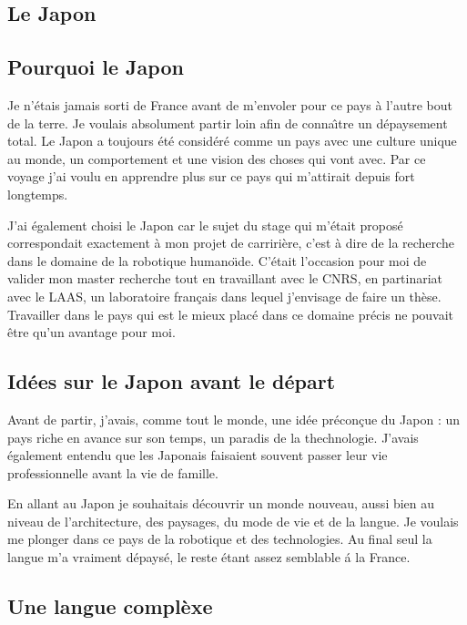 \documentclass[journal]{RapportFR}
\begin{document}
\begin{CJK*}{UTF8}{min}
\section{Le Japon}

\subsection{Pourquoi le Japon}

Je n'\'etais jamais sorti de France avant de m'envoler pour ce pays \`a l'autre bout de la terre. Je voulais absolument partir loin afin de conna\^\i tre un d\'epaysement total.
Le Japon a toujours \'et\'e consid\'er\'e comme un pays avec une culture unique au monde, un comportement et une vision des choses qui vont avec. Par ce voyage j'ai voulu en apprendre plus sur ce pays qui m'attirait depuis fort longtemps. 

J'ai \'egalement choisi le Japon car le sujet du stage qui m'\'etait propos\'e correspondait exactement \`a mon projet de carriri\`ere, c'est \`a dire de la recherche dans le domaine de la robotique humano\"\i de. C'\'etait l'occasion pour moi de valider mon master recherche tout en travaillant avec le CNRS, en partinariat avec le LAAS, un laboratoire français dans lequel j'envisage de faire un th\`ese. Travailler dans le pays qui est le mieux plac\'e dans ce domaine pr\'ecis ne pouvait \^etre qu'un avantage pour moi.

\subsection{Id\'ees sur le Japon avant le d\'epart}

Avant de partir, j'avais, comme tout le monde, une id\'ee pr\'econ\c cue du Japon : un pays riche en avance sur son temps, un paradis de la thechnologie. J'avais \'egalement entendu que les Japonais faisaient souvent passer leur vie professionnelle avant la vie de famille. 

En allant au Japon je souhaitais d\'ecouvrir un monde nouveau, aussi bien au niveau de l'architecture, des paysages, du mode de vie et de la langue. Je voulais me plonger dans ce pays de la robotique et des technologies. Au final seul la langue m'a vraiment d\'epays\'e, le reste \'etant assez semblable \'a la France.

\subsection{Une langue compl\`exe}


\end{CJK*}
\end{document}
